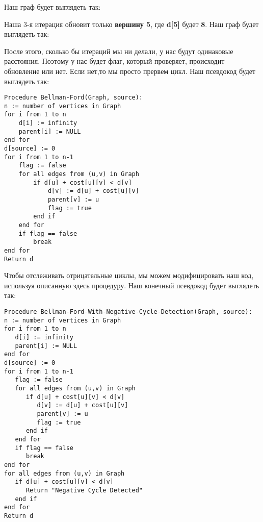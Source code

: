 Наш граф будет выглядеть так:

\begin{center}
\end{center}

Наша 3-я итерация обновит только \textbf{вершину 5}, где \textbf{d[5]} будет \textbf{8}. Наш граф будет выглядеть так:

\begin{center}
\end{center}

После этого, сколько бы итераций мы ни делали, у нас будут одинаковые расстояния. Поэтому у нас будет флаг, который проверяет, происходит обновление или нет. Если нет,то мы просто прервем цикл. Наш псевдокод будет выглядеть так:

\begin{tcolorbox}
\begin{verbatim}
Procedure Bellman-Ford(Graph, source):
n := number of vertices in Graph
for i from 1 to n
    d[i] := infinity
    parent[i] := NULL
end for
d[source] := 0
for i from 1 to n-1
    flag := false
    for all edges from (u,v) in Graph
        if d[u] + cost[u][v] < d[v]
            d[v] := d[u] + cost[u][v]
            parent[v] := u
            flag := true
        end if
    end for
    if flag == false
        break
end for
Return d
\end{verbatim}
\end{tcolorbox}

Чтобы отслеживать отрицательные циклы, мы можем модифицировать наш код, используя описанную здесь процедуру. Наш конечный псевдокод будет выглядеть так:

\begin{tcolorbox}
\begin{verbatim}
Procedure Bellman-Ford-With-Negative-Cycle-Detection(Graph, source):
n := number of vertices in Graph
for i from 1 to n
   d[i] := infinity
   parent[i] := NULL
end for
d[source] := 0
for i from 1 to n-1
   flag := false
   for all edges from (u,v) in Graph
      if d[u] + cost[u][v] < d[v]
         d[v] := d[u] + cost[u][v]
         parent[v] := u
         flag := true
      end if
   end for
   if flag == false
      break
end for
for all edges from (u,v) in Graph
   if d[u] + cost[u][v] < d[v]
      Return "Negative Cycle Detected"
   end if
end for
Return d
\end{verbatim}
\end{tcolorbox}

